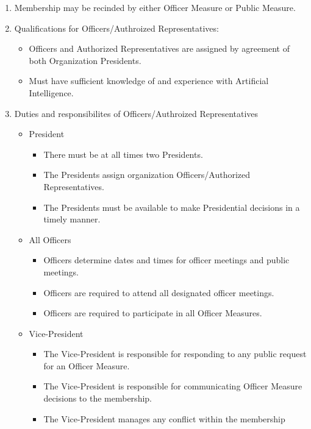 \documentclass{article}
\begin{document}
\begin{enumerate}
\item
  Membership may be recinded by either Officer Measure or Public Measure.

\item
  Qualifications for Officers/Authroized Representatives:
  \begin{itemize}
    \item
      Officers and Authorized Representatives are assigned by agreement of both Organization Presidents. 
    \item
      Must have sufficient knowledge of and experience with Artificial Intelligence. 
  \end{itemize}

\item
  Duties and responsibilites of Officers/Authroized Representatives
  \begin{itemize}

    \item
      President
      \begin{itemize}
      \item There must be at all times two Presidents. 
      \item The Presidents assign organization Officers/Authorized Representatives.
      \item The Presidents must be available to make Presidential decisions in a timely manner. 
      \end{itemize}
    \item All Officers
      \begin{itemize}
        \item Officers determine dates and times for officer meetings and public meetings.
        \item Officers are required to attend all designated officer meetings. 
        \item Officers are required to participate in all Officer Measures. 
      \end{itemize}
    \item
      Vice-President
      \begin{itemize}
      \item The Vice-President is responsible for responding to any public request for an Officer Measure.
      \item The Vice-President is responsible for communicating Officer Measure decisions to the membership. 
      \item The Vice-President manages any conflict within the membership
      \end{itemize}
      

\end{itemize}
\end{enumerate}
\end{document}
